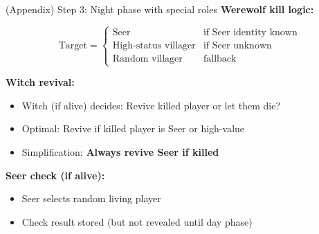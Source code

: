 \documentclass[10pt]{beamer}
\begin{document}
\begin{frame}{(Appendix) Step 3: Night phase with special roles}
  \textbf{Werewolf kill logic:}
  
  $$\text{Target} = \begin{cases}
    \text{Seer} & \text{if Seer identity known} \\
    \text{High-status villager} & \text{if Seer unknown} \\
    \text{Random villager} & \text{fallback}
  \end{cases}$$

  \vspace{0.3cm}
  \textbf{Witch revival:}
  \begin{itemize}
    \item Witch (if alive) decides: Revive killed player or let them die? 
    \item Optimal: Revive if killed player is Seer or high-value 
    \item Simplification: \textbf{Always revive Seer if killed}
  \end{itemize}

  \vspace{0.3cm}
  \textbf{Seer check (if alive):}
  \begin{itemize}
    \item Seer selects random living player 
    \item Check result stored (but not revealed until day phase) 
  \end{itemize}

\end{frame}
\end{document}
